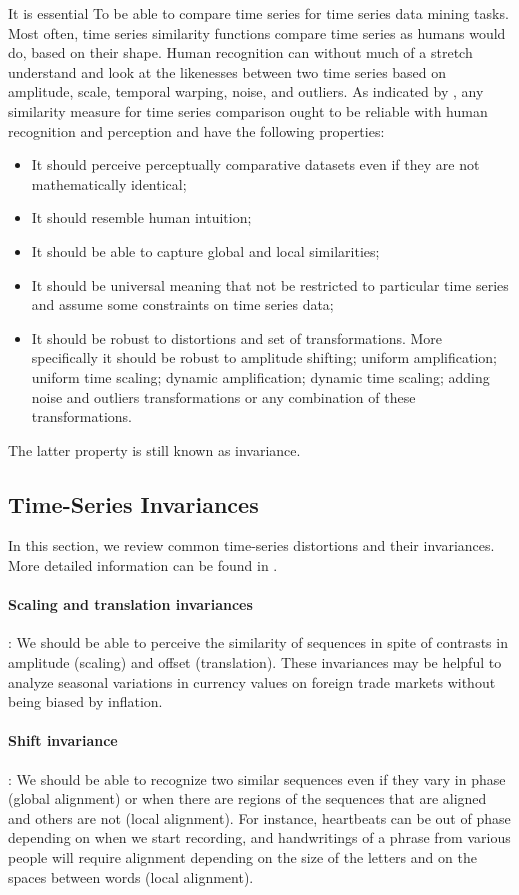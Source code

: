 It is essential To be able to compare time series  for time series data mining tasks. Most often, time series similarity functions compare time series as humans would do, based on their shape. Human recognition can without much of a stretch understand and look at the likenesses between two time series based on amplitude, scale, temporal warping, noise, and outliers. As indicated by \cite{fu2011review, ralanamahatana2005mining, Esling2012}, any similarity measure  for time series comparison ought to be reliable with human recognition and perception and have the following properties:


\begin{itemize}
\item It should perceive perceptually comparative datasets even if  they are not mathematically identical;
\item It should resemble human intuition;
\item It should be able to capture global and local similarities;
\item It should be universal meaning that not be restricted to particular time series and assume some constraints on time series data;
\item It should be robust to distortions and set of transformations. More specifically it should be robust to amplitude
shifting; uniform amplification; uniform time scaling; dynamic amplification; dynamic time scaling; adding noise and outliers transformations or any combination of these transformations.
\end{itemize}
The latter property is still known as invariance.

\subsection{Time-Series Invariances}
In this section, we review common time-series distortions and their invariances. More detailed information can be found in \cite{batista2014cid}. 

\paragraph{Scaling and translation invariances}:  We should be able to perceive the similarity of sequences in spite of contrasts in amplitude (scaling) and offset (translation). These invariances may be helpful to analyze seasonal variations in currency values on foreign trade markets without being biased by inflation.


\paragraph{Shift invariance}:  We should be able to recognize two similar sequences even if they vary in phase (global alignment) or when there are regions of the sequences that are aligned and others are not (local alignment). For instance, heartbeats can be out of phase depending on when we start recording, and handwritings of a phrase from various people will require alignment depending on the size of the letters and on the spaces between words (local alignment).


